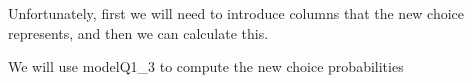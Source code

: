 \documentclass[
]{article}
\newenvironment{Shaded}{\begin{snugshade}}{\end{snugshade}}
\newcommand{\CommentTok}[1]{\textcolor[rgb]{0.56,0.35,0.01}{\textit{#1}}}
\newcommand{\DataTypeTok}[1]{\textcolor[rgb]{0.13,0.29,0.53}{#1}}
\newcommand{\DecValTok}[1]{\textcolor[rgb]{0.00,0.00,0.81}{#1}}
\newcommand{\FloatTok}[1]{\textcolor[rgb]{0.00,0.00,0.81}{#1}}
\newcommand{\KeywordTok}[1]{\textcolor[rgb]{0.13,0.29,0.53}{\textbf{#1}}}
\newcommand{\NormalTok}[1]{#1}
\newcommand{\OperatorTok}[1]{\textcolor[rgb]{0.81,0.36,0.00}{\textbf{#1}}}
\newcommand{\StringTok}[1]{\textcolor[rgb]{0.31,0.60,0.02}{#1}}
\begin{document}
Unfortunately, first we will need to introduce columns that the new
choice represents, and then we can calculate this.

\begin{Shaded}
\end{Shaded}

We will use modelQ1\_3 to compute the new choice probabilities
\end{document}
